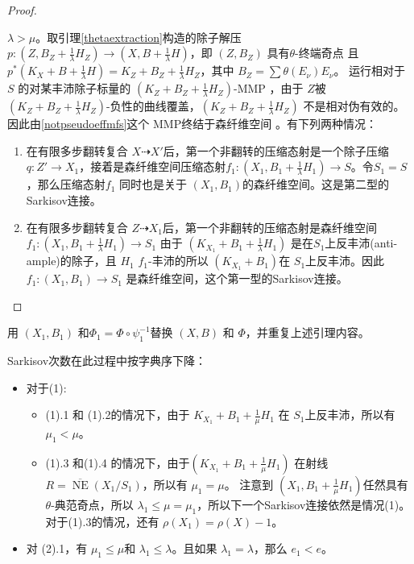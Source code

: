 \begin{proof}
\begin{enumerate}
\begin{enumerate}
    \end{enumerate}
   $\lambda>\mu$。取引理\ref{thetaextraction}构造的除子解压 $ p:(Z,B_Z+\frac{1}{\lambda}H_Z)\to (X,B+\frac{1}{\lambda}H) $，即   $ (Z,B_Z) $ 具有$ \theta $-终端奇点 且 $ p^*(K_X+B+\frac{1}{\lambda}H)=K_Z+B_Z+\frac{1}{\lambda}H_Z $，其中 $ B_Z=\sum\theta(E_\nu)E_\nu $。
    运行相对于 $S$ 的对某丰沛除子标量的 $ (K_Z+B_Z+\frac{1}{\lambda}H_Z) $-MMP ，由于 $Z$被 $ (K_Z+B_Z+\frac{1}{\lambda}H_Z) $-负性的曲线覆盖，$ (K_Z+B_Z+\frac{1}{\lambda}H_Z) $ 不是相对伪有效的。因此由\ref{notpseudoeffmfs}这个 MMP终结于森纤维空间 。有下列两种情况：
    \begin{enumerate}
      \item 在有限多步翻转复合 $ X\dashrightarrow X' $后，第一个非翻转的压缩态射是一个除子压缩 $ q:Z'\to X_1 $，接着是森纤维空间压缩态射$f_1:(X_1,B_1+\frac{1}{\lambda}H_1)\to S$。令$ S_1=S $，那么压缩态射$f_1$ 同时也是关于 $(X_1, B_1)$的森纤维空间。这是第二型的Sarkisov连接。
      \item 在有限多步翻转复合 $ Z\dashrightarrow X_1 $后，第一个非翻转的压缩态射是森纤维空间$f_1:(X_1,B_1+\frac{1}{\lambda}H_1)\to S_1$ 由于 $ (K_{X_1}+B_1+\frac{1}{\lambda}H_1) $ 是在$S_1$上反丰沛(anti-ample)的除子，且 $ H_1 $  $ f_1 $-丰沛的所以 $(K_{X_1}+B_1) $在 $S_1$上反丰沛。因此$ f_1:(X_1, B_1)\to S_1 $ 是森纤维空间，这个第一型的Sarkisov连接。
    \end{enumerate}
  \end{enumerate}
\end{proof}
用  $(X_1,B_1)$ 和$\Phi_{1}=\Phi\circ\psi_1^{-1}$替换 $(X,B)$ 和 $\Phi$，并重复上述引理内容。 
\begin{remark} \label{R-Sarkisovdeg}
  Sarkisov次数在此过程中按字典序下降：
  \begin{itemize}
    \item 对于(1):
      \begin{itemize}
            \item  (1).1 和 (1).2的情况下，由于 $ K_{X_1}+B_1+\frac{1}{\mu}H_1 $ 在 $S_1$上反丰沛，所以有 $\mu_1<\mu$。
            \item (1).3 和(1).4 的情况下，由于$ (K_{X_1}+B_1+\frac{1}{\mu}H_1) $ 在射线 $ R=\overline{\operatorname{NE}}(X_1/S_1) $，所以有 $\mu_1=\mu$。
              注意到 $ (X_1,B_1+\frac{1}{\mu}H_1) $任然具有$ \theta $-典范奇点，所以 $\lambda_1\leqslant \mu=\mu_1$，所以下一个Sarkisov连接依然是情况(1)。对于(1).3的情况，还有 $\rho(X_1)=\rho(X)-1$。
      \end{itemize}
    \item 对 (2).1，有 $\mu_1\leqslant \mu$和  $\lambda_1\leqslant \lambda$。且如果 $ \lambda_1=\lambda $，那么 $e_1<e$。
  \end{itemize}
\end{remark}

